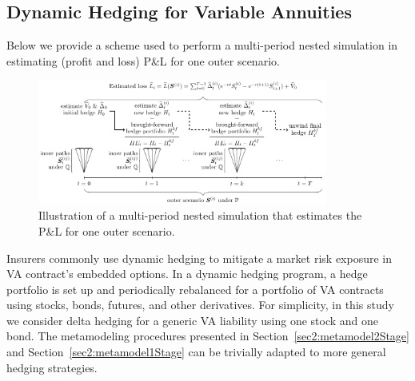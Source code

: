 \subsection{Dynamic Hedging for Variable Annuities}\label{subsec:dynamicHedge}

Below we provide a scheme used to perform a multi-period nested simulation in estimating (profit and loss) P\&L for one outer scenario.

\begin{figure}[ht]
    \centering
    \includegraphics[width=0.85\textwidth]{./project2/figures/sns.pdf}
    \caption{Illustration of a multi-period nested simulation that estimates the P\&L for one outer scenario.}
    \label{fig2:illustration}
\end{figure}

Insurers commonly use dynamic hedging to mitigate a market risk exposure in VA contract's embedded options.
In a dynamic hedging program, a hedge portfolio is set up and periodically rebalanced for a portfolio of VA contracts using stocks, bonds, futures, and other derivatives.
For simplicity, in this study we consider delta hedging for a generic VA liability using one stock and one bond.
The metamodeling procedures presented in Section~\ref{sec2:metamodel2Stage} and Section~\ref{sec2:metamodel1Stage} can be trivially adapted to more general hedging strategies.


